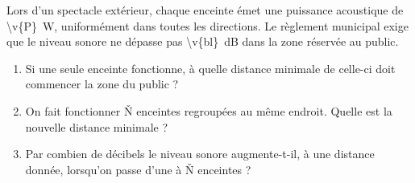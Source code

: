 Lors d'un spectacle extérieur, chaque enceinte émet une puissance acoustique de \qty{\v{P}}{W}, uniformément dans toutes les directions. Le règlement municipal exige que le niveau sonore ne dépasse pas \qty{\v{bl}}{dB} dans la zone réservée au public.

\begin{enumerate}[label=\alph*)]
    \item Si une seule enceinte fonctionne, à quelle distance minimale de celle-ci doit commencer la zone du public ?
    \item On fait fonctionner \v{N} enceintes regroupées au même endroit. Quelle est la nouvelle distance minimale ?
    \item Par combien de décibels le niveau sonore augmente-t-il, à une distance donnée, lorsqu'on passe d'une à \v{N} enceintes ?
\end{enumerate}
